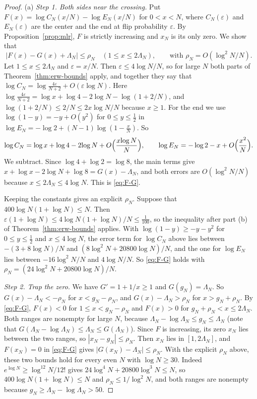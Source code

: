 \begin{proof}
(a) \emph{Step 1. Both sides near the crossing.} Put
$F(x)=\log C_N(x/N)-\log E_N(x/N)$ for $0<x<N$, where $C_N(\varepsilon)$ and
$E_N(\varepsilon)$ are the center and the end at flip probability
$\varepsilon$. By Proposition~\ref{prop:mlr}, $F$ is strictly increasing and
$x_N$ is its only zero. We show that
\begin{equation}\tag{$\ast$}\label{eq:F-G}
 \lvert F(x)-G(x)+\Lambda_N\rvert\le\rho_N\quad(1\le x\le2\Lambda_N),
 \qquad\text{with }\rho_N=O(\log^2N/N).
\end{equation}
Let $1\le x\le2\Lambda_N$ and $\varepsilon=x/N$. Then
$\varepsilon\le4{\log N}/N$, so for large $N$ both parts of
Theorem~\ref{thm:erw-bounds} apply, and together they say that
$\log C_N=\log\frac{4\varepsilon}{N+2}+O(\varepsilon {\log N})$. Here
$\log\frac{4\varepsilon}{N+2}=\log x+\log4-2{\log N}-\log(1+2/N)$, and
$\log(1+2/N)\le2/N\le2x{\log N}/N$ because $x\ge1$. For the end we use
$\log(1-y)=-y+O(y^2)$ for $0\le y\le\frac12$ in
$\log E_N=-\log2+(N-1)\log(1-\frac xN)$. So
\[
 \log C_N=\log x+\log4-2{\log N}+O\Bigl(\frac{x{\log N}}N\Bigr),\qquad
 \log E_N=-\log2-x+O\Bigl(\frac{x^2}N\Bigr).
\]
We subtract. Since $\log4+\log2=\log8$, the main terms give
$x+\log x-2{\log N}+\log8=G(x)-\Lambda_N$, and both errors are $O(\log^2N/N)$ because
$x\le2\Lambda_N\le4{\log N}$. This is \eqref{eq:F-G}.

Keeping the constants gives an explicit $\rho_N$. Suppose that
$400{\log N}(1+{\log N})\le N$. Then $\varepsilon(1+\log N)\le4{\log N}(1+{\log N})/N\le\frac1{100}$,
so the inequality after part (b) of Theorem~\ref{thm:erw-bounds} applies. With
$\log(1-y)\ge-y-y^2$ for $0\le y\le\frac12$ and $x\le4{\log N}$, the error term for
$\log C_N$ above lies between $-(3+8{\log N})/N$ and $(8\log^2N+20800{\log N})/N$, and the one
for $\log E_N$ lies between $-16\log^2N/N$ and $4{\log N}/N$. So \eqref{eq:F-G} holds
with $\rho_N=(24\log^2N+20800{\log N})/N$.

\emph{Step 2. Trap the zero.} We have $G'=1+1/x\ge1$ and $G(g_N)=\Lambda_N$.
So $G(x)-\Lambda_N<-\rho_N$ for $x<g_N-\rho_N$, and
$G(x)-\Lambda_N>\rho_N$ for $x>g_N+\rho_N$. By \eqref{eq:F-G}, $F(x)<0$ for
$1\le x<g_N-\rho_N$ and $F(x)>0$ for $g_N+\rho_N<x\le2\Lambda_N$. Both ranges
are nonempty for large $N$, because
$\Lambda_N-\log\Lambda_N\le g_N\le\Lambda_N$ (note that
$G(\Lambda_N-\log\Lambda_N)\le\Lambda_N\le G(\Lambda_N)$). Since $F$ is
increasing, its zero $x_N$ lies between the two ranges, so
$|x_N-g_N|\le\rho_N$. Then $x_N$ lies in $[1,2\Lambda_N]$, and $F(x_N)=0$ in
\eqref{eq:F-G} gives $|G(x_N)-\Lambda_N|\le\rho_N$. With the explicit $\rho_N$ above, these two
bounds hold for every even $N$ with ${\log N}\ge30$. Indeed $e^{\log N}\ge \log^{12}N/12!$ gives
$24\log^4N+20800\log^3N\le N$, so $400{\log N}(1+{\log N})\le N$ and $\rho_N\le1/\log^2N$, and both ranges are nonempty
because $g_N\ge\Lambda_N-\log\Lambda_N>50$.


\end{proof}
